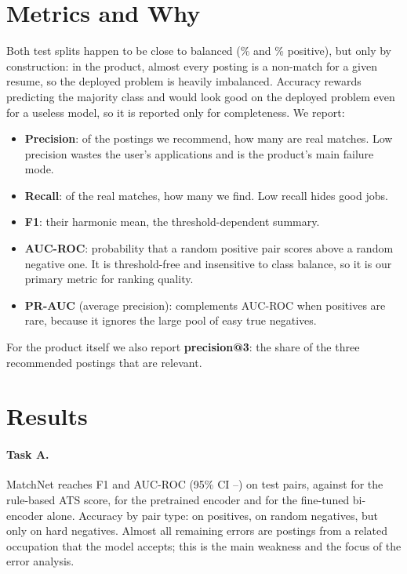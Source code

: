\documentclass[11pt,a4paper]{article}
\begin{document}
\section{Metrics and Why}\label{sec:metrics}
Both test splits happen to be close to balanced (\ResAPosShare\% and \ResBPosShare\% positive),
but only by construction: in the product, almost every posting is a non-match for a given resume,
so the deployed problem is heavily imbalanced. Accuracy rewards predicting the majority class and
would look good on the deployed problem even for a useless model, so it is reported only for
completeness. We report:
\begin{itemize}
\item \textbf{Precision}: of the postings we recommend, how many are real matches. Low precision
wastes the user's applications and is the product's main failure mode.
\item \textbf{Recall}: of the real matches, how many we find. Low recall hides good jobs.
\item \textbf{F1}: their harmonic mean, the threshold-dependent summary.
\item \textbf{AUC-ROC}: probability that a random positive pair scores above a random negative one.
It is threshold-free and insensitive to class balance, so it is our primary metric for ranking quality.
\item \textbf{PR-AUC} (average precision): complements AUC-ROC when positives are rare, because it
ignores the large pool of easy true negatives.
\end{itemize}
For the product itself we also report \textbf{precision@3}: the share of the three recommended
postings that are relevant.

\section{Results}\label{sec:results}



\paragraph{Task A.} MatchNet reaches F1 \ResAF and AUC-ROC \ResAAuc (95\% CI \ResAAucLo--\ResAAucHi)
on \ResAN test pairs, against \ResAAtsAuc for the rule-based ATS score, \ResAPreAuc for the
pretrained encoder and \ResABiAuc for the fine-tuned bi-encoder alone. Accuracy by pair type:
\AccPos on positives, \AccRand on random negatives, but only \AccHard on hard negatives. Almost all
remaining errors are postings from a related occupation that the model accepts; this is the main
weakness and the focus of the error analysis.
\end{document}
